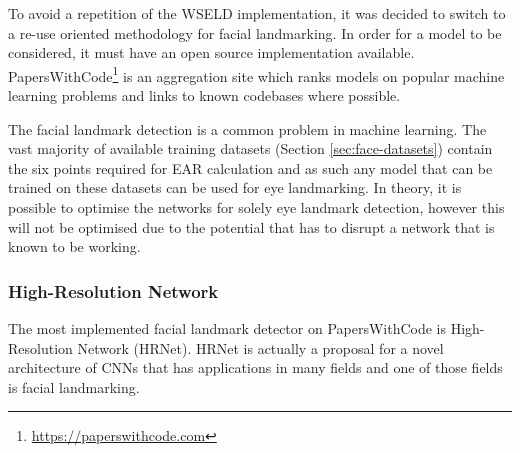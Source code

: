 
To avoid a repetition of the WSELD implementation, it was decided to switch to a re-use oriented methodology for facial landmarking. In order for a model to be considered, it must have an open source implementation available. PapersWithCode\footnote{\url{https://paperswithcode.com}} is an aggregation site which ranks models on popular machine learning problems and links to known codebases where possible. 

The facial landmark detection is a common problem in machine learning. The vast majority of available training datasets (Section \ref{sec:face-datasets}) contain the six points required for EAR calculation and as such any model that can be trained on these datasets can be used for eye landmarking. In theory, it is possible to optimise the networks for solely eye landmark detection, however this will not be optimised due to the potential that has to disrupt a network that is known to be working.

\subsubsection{High-Resolution Network}


The most implemented facial landmark detector on PapersWithCode is High-Resolution Network (HRNet)\cite{sun2019high}. HRNet is actually a proposal for a novel architecture of CNNs that has applications in many fields and one of those fields is facial landmarking.

